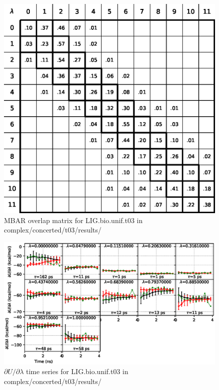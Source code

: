 \documentclass[journal=jctcce,manuscript=article,hyperref=false]{achemso}
\begin{document}
\begin{figure}
\includegraphics[clip,width=6in]{complex.concerted.t03.results..S.eps}\vspace{-0.3cm}
\caption{MBAR overlap matrix for LIG.bio.unif.t03 in complex/concerted/t03/results/}
\end{figure}


\begin{figure}
\includegraphics[clip,width=6in]{complex.concerted.t03.results..DVDLvsT.eps}\vspace{-0.3cm}
\caption{$\partial U/\partial\lambda$ time series for LIG.bio.unif.t03 in complex/concerted/t03/results/}
\end{figure}
\end{document}
